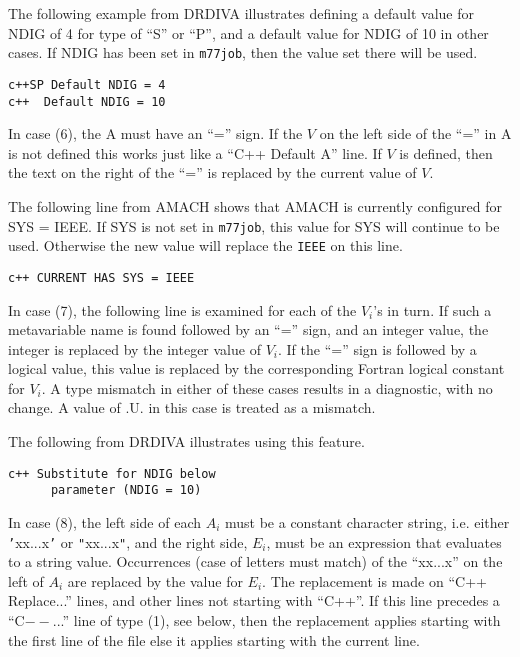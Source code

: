 \documentclass[twoside]{MATH77}
\begin{document}
The following example from DRDIVA illustrates defining a default
value for NDIG of 4 for type of ``S'' or ``P'', and a default value for NDIG
of 10 in other cases.  If NDIG has been set in {\tt m77job}, then
the value set there will be used.

\begin{verbatim}
c++SP Default NDIG = 4
c++  Default NDIG = 10
\end{verbatim}

In case (6), the A must have an ``='' sign.  If the $V$ on the left
side of the ``=''  in A is not defined this works just like a
``C++ Default A'' line.  If $V$ is defined, then the text on the
right of the ``='' is replaced by the current value of $V$.

The following line from AMACH shows that AMACH is currently
configured for SYS = IEEE.  If SYS is not set in {\tt m77job}, this
value for SYS will continue to be used.  Otherwise the new value will
replace the {\tt IEEE} on this line.

{\tt c++ CURRENT HAS SYS = IEEE}

In case (7), the following line is examined for each of the $V_i$'s in
turn.  If such a metavariable name is found followed by an ``='' sign, and
an integer value, the integer is replaced by the integer value of $V_i$.
If the ``='' sign is followed by a logical value, this value is replaced
by the corresponding Fortran logical constant for $V_i$.  A type mismatch
in either of these cases results in a diagnostic, with no change.  A
value of .U. in this case is treated as a mismatch.

The following from DRDIVA illustrates using this feature.

\begin{verbatim}
c++ Substitute for NDIG below
      parameter (NDIG = 10)
\end{verbatim}

In case (8), the left side of each $A_i$ must be a constant character
string, i.e. either {\tt '}xx...x{\tt '} or {\tt "}xx...x{\tt "}, and
the right side, $E_i$,  must be an expression that evaluates to a
string value.  Occurrences (case of letters must match) of the
``xx...x'' on the left of $A_i$ are replaced by the value for $E_i$.
The replacement is made on ``C++ Replace...'' lines, and other lines
not starting with ``C++''.  If this line precedes a ``C$--$...'' line
of type (1), see below, then the replacement applies starting with
the first line of the file else it applies starting with the current
line.
\end{document}
